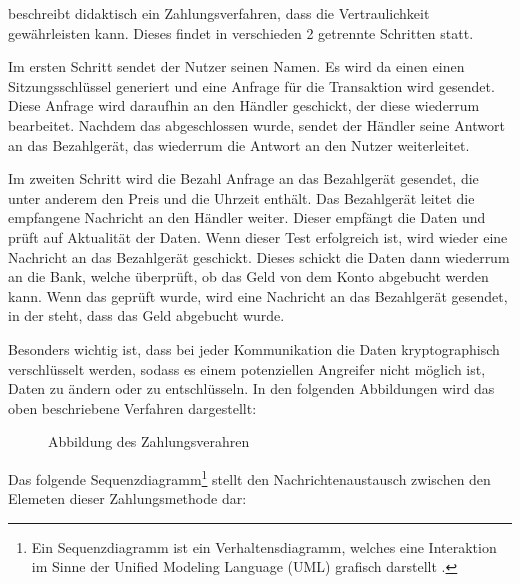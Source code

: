 \cite{refart:JTAS} beschreibt didaktisch ein Zahlungsverfahren, dass die Vertraulichkeit gewährleisten kann.
Dieses findet in verschieden 2 getrennte Schritten statt.

Im ersten Schritt sendet der Nutzer seinen Namen. Es wird da einen einen Sitzungsschlüssel generiert und 
eine Anfrage für die Transaktion wird gesendet. Diese Anfrage wird daraufhin an den Händler geschickt, der 
diese wiederrum bearbeitet. Nachdem das abgeschlossen wurde, sendet der Händler seine Antwort an das Bezahlgerät, 
das wiederrum die Antwort an den Nutzer weiterleitet. 

Im zweiten Schritt wird die Bezahl Anfrage an das Bezahlgerät gesendet, die unter anderem den Preis und die 
Uhrzeit enthält. Das Bezahlgerät leitet die empfangene Nachricht an den Händler weiter. Dieser empfängt die Daten 
und prüft auf Aktualität der Daten. Wenn dieser Test erfolgreich ist, wird wieder eine Nachricht an das Bezahlgerät 
geschickt. Dieses schickt die Daten dann wiederrum an die Bank, welche überprüft, ob das Geld von dem Konto 
abgebucht werden kann. Wenn das geprüft wurde, wird eine Nachricht an das Bezahlgerät gesendet, in der steht, 
dass das Geld abgebucht wurde. 

Besonders wichtig ist, dass bei jeder Kommunikation die Daten kryptographisch verschlüsselt werden, sodass es einem 
potenziellen Angreifer nicht möglich ist, Daten zu ändern oder zu entschlüsseln. In den folgenden Abbildungen wird
das oben beschriebene Verfahren dargestellt:

\begin{figure}[H]
    \caption{Abbildung des Zahlungsverahren \cite{refart:JTAS}}
    \label{fig:refart:JTAS}
\end{figure}

Das folgende Sequenzdiagramm\footnote{Ein Sequenzdiagramm ist ein Verhaltensdiagramm, welches eine Interaktion
im Sinne der Unified Modeling Language (UML) grafisch darstellt \cite{refbook:IASE}.} stellt den 
Nachrichtenaustausch zwischen den Elemeten dieser Zahlungsmethode dar:

